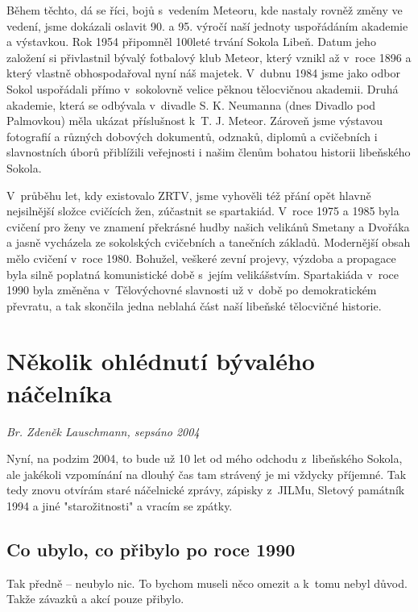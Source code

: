 \documentclass[a5paper, 11pt, twoside]{article}
\begin{document}
Během těchto, dá se říci, bojů s~vedením Meteoru, kde nastaly rovněž
změny ve vedení, jsme dokázali oslavit 90. a 95. výročí naší jednoty
uspořádáním akademie a výstavkou. Rok 1954 připomněl 100leté trvání
Sokola Libeň. Datum jeho založení si přivlastnil bývalý fotbalový klub
Meteor, který vznikl až v~roce 1896 a který vlastně obhospodařoval nyní
náš majetek. V~dubnu 1984 jsme jako odbor Sokol uspořádali přímo
v~sokolovně velice pěknou tělocvičnou akademii. Druhá akademie, která se
odbývala v~divadle S. K. Neumanna (dnes Divadlo pod Palmovkou) měla
ukázat příslušnost k~T. J. Meteor. Zároveň jsme výstavou fotografií a
různých dobových dokumentů, odznaků, diplomů a cvičebních i slavnostních
úborů přiblížili veřejnosti i našim členům bohatou historii libeňského
Sokola.

V~průběhu let, kdy existovalo ZRTV, jsme vyhověli též přání opět hlavně
nejsilnější složce cvičících žen, zúčastnit se spartakiád. V~roce 1975 a
1985 byla cvičení pro ženy ve znamení překrásné hudby našich velikánů
Smetany a Dvořáka a jasně vycházela ze sokolských cvičebních a tanečních
základů. Modernější obsah mělo cvičení v~roce 1980. Bohužel, veškeré
zevní projevy, výzdoba a propagace byla silně poplatná komunistické době
s~jejím velikášstvím. Spartakiáda v~roce 1990 byla změněna
v~Tělovýchovné slavnosti už v~době po demokratickém převratu, a tak
skončila jedna neblahá část naší libeňské tělocvičné historie.

\section{Několik ohlédnutí bývalého
náčelníka}
\begin{center}
  \textit{Br. Zdeněk Lauschmann, sepsáno 2004}
\end{center}

\noindent
Nyní, na podzim 2004, to bude už 10 let od mého odchodu z~libeňského
Sokola, ale jakékoli vzpomínání na dlouhý čas tam strávený je mi vždycky
příjemné. Tak tedy znovu otvírám staré náčelnické zprávy, zápisky
z~JILMu, Sletový památník 1994 a jiné "starožitnosti" a vracím se zpátky.

\subsection{Co ubylo, co přibylo po roce
1990}

Tak předně -- neubylo nic. To bychom museli něco omezit a k~tomu nebyl
důvod. Takže závazků a akcí pouze přibylo.
\end{document}
